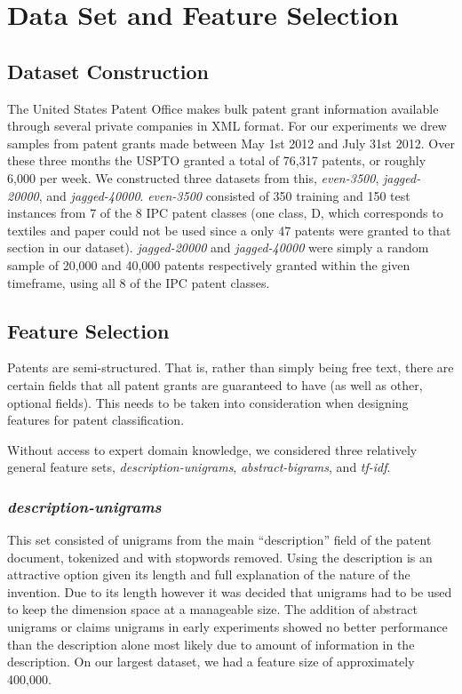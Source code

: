 \section{Data Set and Feature Selection}

\subsection{Dataset Construction}
\indent
The United States Patent Office makes bulk patent grant information available through several private companies\cite{USPTO:2013:patent-catalog} in XML format\cite{USPTO:2013:dtd}. For our experiments we drew samples from patent grants made between May 1st 2012 and July 31st 2012. Over these three months the USPTO granted a total of 76,317 patents, or roughly 6,000 per week. We constructed three datasets from this, \emph{even-3500}, \emph{jagged-20000}, and \emph{jagged-40000}. \emph{even-3500} consisted of 350 training and 150 test instances from 7 of the 8 IPC patent classes (one class, D, which corresponds to textiles and paper could not be used since a only 47 patents were granted to that section in our dataset). \emph{jagged-20000} and \emph{jagged-40000} were simply a random sample of 20,000 and 40,000 patents respectively granted within the given timeframe, using all 8 of the IPC patent classes.

\subsection{Feature Selection}
\indent
Patents are semi-structured. That is, rather than simply being free text, there are certain fields that all patent grants are guaranteed to have (as well as other, optional fields). This needs to be taken into consideration when designing features for patent classification. 

Without access to expert domain knowledge, we considered three relatively general feature sets, \emph{description-unigrams}, \emph{abstract-bigrams}, and \emph{tf-idf}.
\subsubsection{\emph{description-unigrams}}
This set consisted of unigrams from the main ``description'' field of the patent document, tokenized and with stopwords removed.  Using the description is an attractive option given its length and full explanation of the nature of the invention.  Due to its length however it was decided that unigrams had to be used to keep the dimension space at a manageable size.  The addition of abstract unigrams or claims unigrams in early experiments showed no better performance than the description alone most likely due to amount of information in the description.  On our largest dataset, we had a feature size of approximately 400,000. 
